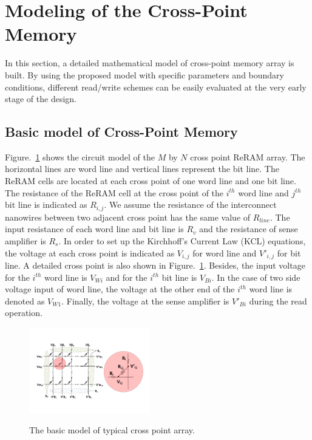 \vspace{10pt}
\section{Modeling of the Cross-Point Memory}\label{sec:model}

In this section, a detailed mathematical model of cross-point memory array is built. By using the proposed model with specific parameters and
boundary conditions, different read/write schemes can be easily evaluated
at the very early stage of the design.

\subsection{Basic model of Cross-Point Memory}
Figure.~\ref{fig:modeling} shows the circuit model of the $M$ by $N$ cross point ReRAM array. The horizontal lines are word line and vertical lines represent the bit line. The ReRAM cells are located at each cross point of one word line and one bit line. The resistance of the ReRAM cell at the cross point of the $i^{th}$ word line and $j^{th}$ bit line is indicated as $R_{i,j}$. We assume the resistance of the interconnect nanowires between two adjacent cross point has the same value of $R_{line}$. The input resistance of each word line and bit line is $R_v$ and the resistance of sense amplifier is $R_s$. In order to set up the Kirchhoff's Current Law (KCL) equations, the voltage at each cross point is indicated as $V_{i,j}$ for word line and $V'_{i,j}$ for bit line. A detailed cross point is also shown in Figure.~\ref{fig:modeling}. Besides, the input voltage for the $i^{th}$ word line is $V_{Wi}$ and for the $i^{th}$ bit line is $V_{Bi}$. In the case of two side voltage input of word line, the voltage at the other end of the $i^{th}$ word line is denoted as $V_{W1}$. Finally, the voltage at the sense amplifier is $V'_{Bi}$ during the read operation.

\begin{figure}
\centering
  \includegraphics[width=0.47\textwidth]{./figures/model.pdf}\\
  \caption{The basic model of typical cross point array.}\label{fig:modeling}
\end{figure}
